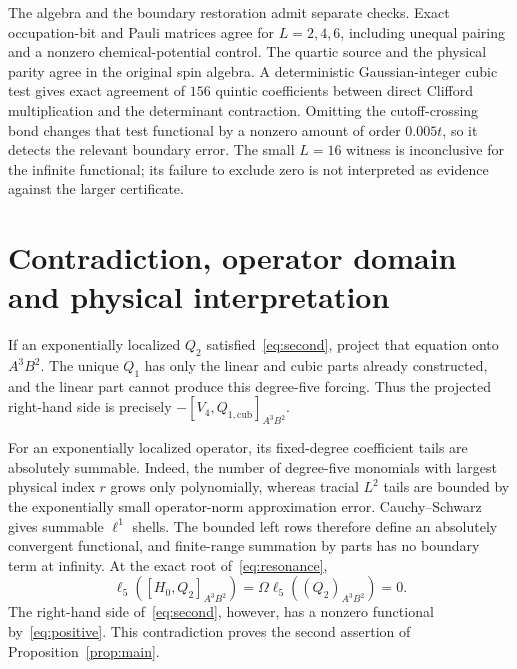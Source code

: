 \documentclass[11pt,a4paper]{article}
\begin{document}
The algebra and the boundary restoration admit separate checks. Exact
occupation-bit and Pauli matrices agree for $L=2,4,6$, including unequal
pairing and a nonzero chemical-potential control. The quartic source and
the physical parity agree in the original spin algebra. A deterministic
Gaussian-integer cubic test gives exact agreement of $156$ quintic
coefficients between direct Clifford multiplication and the determinant
contraction. Omitting the cutoff-crossing bond changes that test functional
by a nonzero amount of order $0.005t$, so it detects the relevant boundary
error. The small $L=16$ witness is inconclusive for the infinite functional;
its failure to exclude zero is not interpreted as evidence against the
larger certificate.

\section{Contradiction, operator domain and physical interpretation}
\label{sec:contradiction}
If an exponentially localized $Q_2$ satisfied~\eqref{eq:second}, project
that equation onto $A^3B^2$. The unique $Q_1$ has only the linear and cubic
parts already constructed, and the linear part cannot produce this
degree-five forcing. Thus the projected right-hand side is precisely
$-[V_4,Q_{1,\mathrm{cub}}]_{A^3B^2}$.

For an exponentially localized operator, its fixed-degree coefficient
tails are absolutely summable. Indeed, the number of degree-five monomials
with largest physical index $r$ grows only polynomially, whereas tracial
$L^2$ tails are bounded by the exponentially small operator-norm
approximation error. Cauchy--Schwarz gives summable $\ell^1$ shells.
The bounded left rows therefore define an absolutely convergent
functional, and finite-range summation by parts has no boundary term at
infinity. At the exact root of~\eqref{eq:resonance},
\begin{equation}
 \ell_5([H_0,Q_2]_{A^3B^2})=\Omega\ell_5((Q_2)_{A^3B^2})=0.
 \label{eq:contradiction}
\end{equation}
The right-hand side of~\eqref{eq:second}, however, has a nonzero
functional by~\eqref{eq:positive}. This contradiction proves the second
assertion of Proposition~\ref{prop:main}.
\end{document}

